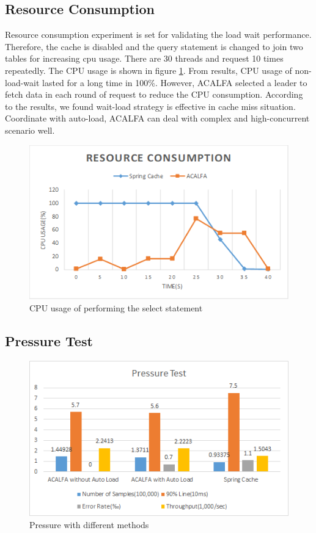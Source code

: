 \documentclass{singlecol-new}
\theoremstyle{TH}{
\newtheorem{lemma}{Lemma}
\newtheorem{theorem}[lemma]{Theorem}
\newtheorem{corrolary}[lemma]{Corrolary}
\newtheorem{conjecture}[lemma]{Conjecture}
\newtheorem{proposition}[lemma]{Proposition}
\newtheorem{claim}[lemma]{Claim}
\newtheorem{stheorem}[lemma]{Wrong Theorem}
}
\theoremstyle{THrm}{
\newtheorem{definition}{Definition}[section]
\newtheorem{question}{Question}[section]
\newtheorem{remark}{Remark}
\newtheorem{scheme}{Scheme}
}
\theoremstyle{THhit}{
\newtheorem{case}{Case}[section]
}
\begin{document}
\subsection{Resource Consumption}

Resource consumption experiment is set for validating the load wait performance. Therefore, the cache is disabled and the query statement is changed to join two tables for increasing cpu usage. There are 30 threads and request 10 times repeatedly. The CPU usage is shown in figure \ref{resource}. From results, CPU usage of non-load-wait lasted for a long time in 100\%. However, ACALFA selected a leader to fetch data in each round of request to reduce the CPU consumption. According to the results, we found wait-load strategy is effective in cache miss situation. Coordinate with auto-load, ACALFA can deal with complex and high-concurrent scenario well.

\begin{figure} [htb]
    \centering
    \includegraphics[width=1\linewidth]{img/resource.png}
    \caption{CPU usage of performing the select statement}
    \label{resource}
\end{figure}

\subsection{Pressure Test}

 \begin{figure}
     \centering
     \includegraphics[width=1\linewidth]{img/pressuretest.png}
     \caption{Pressure with different methods}
     \label{pressuretest}
 \end{figure}
\end{document}
